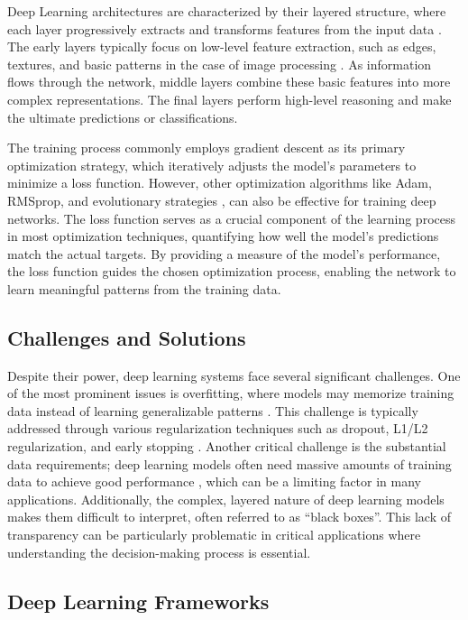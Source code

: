 Deep Learning architectures are characterized by their layered
structure, where each layer progressively extracts and transforms
features from the input data \cite{Taye2023}. The early layers
typically focus on low-level feature extraction, such as edges,
textures, and basic patterns in the case of image processing \cite{Taye2023}.
As information flows through the network, middle layers combine these
basic features into more complex representations. The final layers
perform high-level reasoning and make the ultimate predictions or
classifications.

The training process commonly employs gradient descent  as its primary
optimization strategy, which iteratively adjusts the model's parameters to
minimize a loss function. However, other optimization algorithms like
Adam, RMSprop, and evolutionary strategies \cite{Soydaner2020}
\cite{BinghamEtAl2020}, can also be
effective for training deep networks. The loss function serves as a crucial
component of the learning process in most optimization techniques,
quantifying how well the model's predictions match the actual
targets. By providing a measure of the model's performance, the loss
function guides the chosen optimization process, enabling the network
to learn meaningful patterns from the training data.

\subsection{Challenges and Solutions}

Despite their power, deep learning systems face several significant
challenges. One of the most prominent issues is overfitting, where
models may memorize training data instead of learning generalizable
patterns \cite{RoelofsEtAl2019}. This challenge is typically
addressed through various regularization techniques such as dropout,
L1/L2 regularization, and early stopping \cite{RoelofsEtAl2019}.
Another critical challenge is the substantial data requirements; deep
learning models often need massive amounts of training data to
achieve good performance \cite{RoelofsEtAl2019}, which can be a
limiting factor in many applications.
Additionally, the complex, layered nature
of deep learning models makes them difficult to interpret, often
referred to as ``black boxes''. This lack of transparency can be
particularly problematic in critical applications where understanding
the decision-making process is essential.

\subsection{Deep Learning Frameworks}

